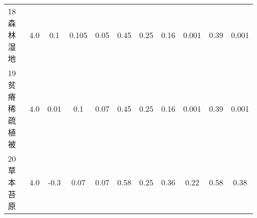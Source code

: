 \begin{sidewaystable}[]
\begin{tabular}{@{}lcccccccccc@{}}
        18 森林湿地    & 4.0        & 0.1                                                                          & 0.105                                                                                                           & 0.05                                                                                                            & 0.45                                                                                                            & 0.25                                                                                                            & 0.16                                                                                                            & 0.001                                                                                                           & 0.39                                                                                                            & 0.001                                                                                                           \\
        19 贫瘠稀疏植被  & 4.0        & 0.01                                                                         & 0.1                                                                                                             & 0.07                                                                                                            & 0.45                                                                                                            & 0.25                                                                                                            & 0.16                                                                                                            & 0.001                                                                                                           & 0.39                                                                                                            & 0.001                                                                                                           \\
        20 草本苔原    & 4.0        & -0.3                                                                         & 0.07                                                                                                            & 0.07                                                                                                            & 0.58                                                                                                            & 0.25                                                                                                            & 0.36                                                                                                            & 0.22                                                                                                            & 0.58                                                                                                            & 0.38                                                                                                            \\

\end{tabular}
\end{sidewaystable}
